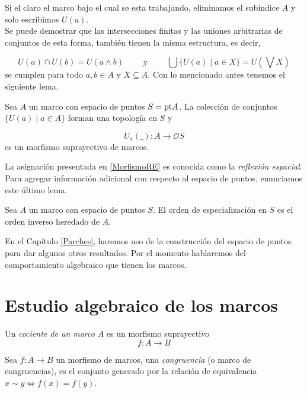 Si el claro el marco bajo el cual se esta trabajando, eliminamos el subindice $A$ y solo escribimos $U(a)$.\\

Se puede demostrar que las intersecciones finitas y las uniones arbitrarias de conjuntos de esta forma, también tienen la misma estructura, es decir,

\[
U(a)\cap U(b)=U(a\wedge b)\qquad\mbox{ y }\qquad\bigcup\{U(a)\mid a\in X\}=U\left(\bigvee X\right)
\]
se cumplen para todo $a, b\in A$ y $X\subseteq A$. Con lo mencionado antes tenemos el siguiente lema.

\begin{lem}\label{ReflexionEspacial}
    Sea $A$ un marco con espacio de puntos $S=\mathrm{pt} A$. La colección de conjuntos $\{U(a)\mid a\in A\}$ forman una topología en $S$ y 

    \begin{equation}\label{MorfismoRE}
            U_a(\_)\colon A\to \mathcal{O}S
    \end{equation}
    es un morfismo suprayectivo de marcos.
\end{lem}
La asignación presentada en \ref{MorfismoRE} es conocida como la \emph{reflexión espacial}.\\

Para agregar información adicional con respecto al espacio de puntos, enunciamos este último lema.

\begin{lem}
    Sea $A$ un marco con espacio de puntos $S$. El orden de especialización en $S$ es el orden inverso heredado de $A$. 
\end{lem}

En el Capítulo \ref{Parches}, haremos uso de la construcción del espacio de puntos para dar algunos otros resultados. Por el momento hablaremos del comportamiento algebraico que tienen los marcos.

\section{Estudio algebraico de los marcos}

\begin{dfn}\label{Cociente}
Un \emph{cociente de un marco} $A$ es un morfismo suprayectivo $$f:A\to B$$
\end{dfn}

\begin{dfn}
Sea $f:A\to B$ un morfismo de marcos, una \emph{congruencia} (o marco de congruencias), es el conjunto generado por la relación de equivalencia $x\sim y\Leftrightarrow f(x)=f(y)$.
\end{dfn}

